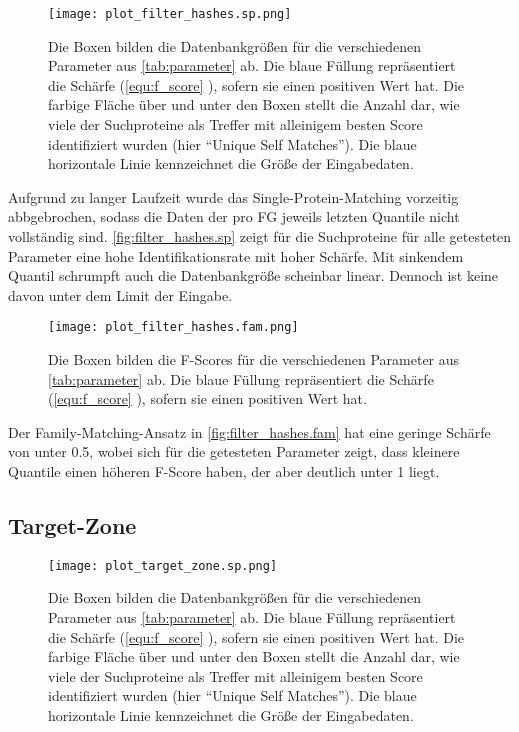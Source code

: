         \begin{figure}[H]
            \centering
            \texttt{[image: plot\_filter\_hashes.sp.png]}
            \caption[Single-Protein-Matching ]{Die Boxen bilden die Datenbankgrößen für die verschiedenen Parameter aus \autoref{tab:parameter} ab. Die blaue Füllung repräsentiert die Schärfe (\autoref{equ:f_score} ), sofern sie einen positiven Wert hat. Die farbige Fläche über und unter den Boxen stellt die Anzahl dar, wie viele der Suchproteine als Treffer mit alleinigem besten Score identifiziert wurden (hier ``Unique Self Matches''). Die blaue horizontale Linie kennzeichnet die Größe der Eingabedaten.}
            \label{fig:filter_hashes.sp}
        \end{figure}

        Aufgrund zu langer Laufzeit wurde das Single-Protein-Matching vorzeitig abbgebrochen, sodass die Daten der pro \ac{FG} jeweils letzten Quantile nicht vollständig sind. \autoref{fig:filter_hashes.sp} zeigt für die Suchproteine für alle getesteten Parameter eine hohe Identifikationsrate mit hoher Schärfe. Mit sinkendem Quantil schrumpft auch die Datenbankgröße scheinbar linear. Dennoch ist keine davon unter dem Limit der Eingabe.

        \begin{figure}[H]
            \centering
            \texttt{[image: plot\_filter\_hashes.fam.png]}
            \caption[Family-Matching ]{Die Boxen bilden die F-Scores für die verschiedenen Parameter aus \autoref{tab:parameter} ab. Die blaue Füllung repräsentiert die Schärfe (\autoref{equ:f_score} ), sofern sie einen positiven Wert hat.}
            \label{fig:filter_hashes.fam}
        \end{figure}

        Der Family-Matching-Ansatz in \autoref{fig:filter_hashes.fam} hat eine geringe Schärfe von unter 0.5, wobei sich für die getesteten Parameter zeigt, dass kleinere Quantile einen höheren F-Score haben, der aber deutlich unter 1 liegt.

    \subsection{Target-Zone} %
        \label{sub:target_results}
        \begin{figure}[H]
            \centering
            \texttt{[image: plot\_target\_zone.sp.png]}
            \caption[Single-Protein-Matching ]{Die Boxen bilden die Datenbankgrößen für die verschiedenen Parameter aus \autoref{tab:parameter} ab. Die blaue Füllung repräsentiert die Schärfe (\autoref{equ:f_score} ), sofern sie einen positiven Wert hat. Die farbige Fläche über und unter den Boxen stellt die Anzahl dar, wie viele der Suchproteine als Treffer mit alleinigem besten Score identifiziert wurden (hier ``Unique Self Matches''). Die blaue horizontale Linie kennzeichnet die Größe der Eingabedaten.}
            \label{fig:target_zone.sp}
        \end{figure}

